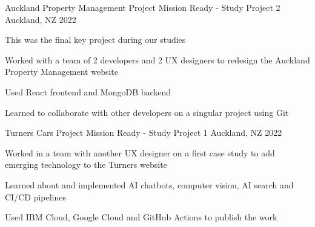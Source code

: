 \begin{cventries}
  \cventry
    {Auckland Property Management Project} %
    {Mission Ready - Study Project 2} %
    {Auckland, NZ} %
    {2022} %
    {
      \begin{cvitems} %
        \item {This was the final key project during our studies}
        \item {Worked with a team of 2 developers and 2 UX designers to redesign the Auckland Property Management website}
        \item {Used React frontend and MongoDB backend}
        \item {Learned to collaborate with other developers on a singular project using Git}
      \end{cvitems}
    }

  \cventry
    {Turners Cars Project} %
    {Mission Ready - Study Project 1} %
    {Auckland, NZ} %
    {2022} %
    {
      \begin{cvitems} %
        \item {Worked in a team with another UX designer on a first case study to add emerging technology to the Turners website}
        \item {Learned about and implemented AI chatbots, computer vision, AI search and CI/CD pipelines}
        \item {Used IBM Cloud, Google Cloud and GitHub Actions to publish the work}
      \end{cvitems}
    }


\end{cventries}
